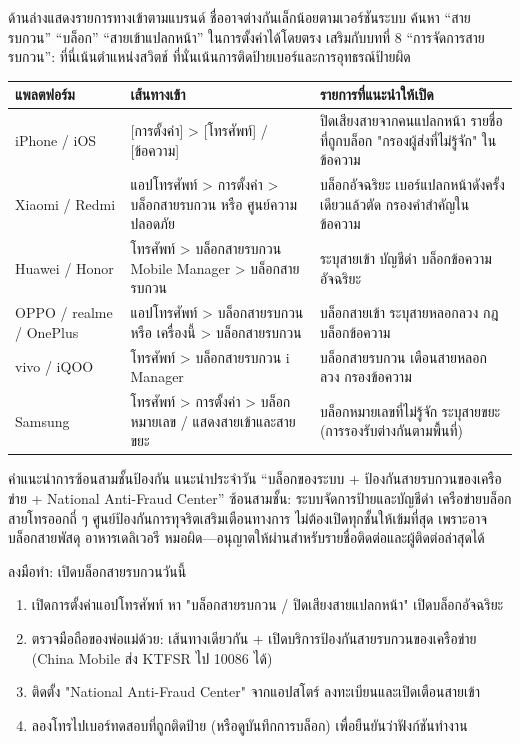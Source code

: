 
ด้านล่างแสดงรายการทางเข้าตามแบรนด์ ชื่ออาจต่างกันเล็กน้อยตามเวอร์ชันระบบ ค้นหา “สายรบกวน” “บล็อก” “สายเข้าแปลกหน้า” ในการตั้งค่าได้โดยตรง เสริมกับบทที่ 8 “การจัดการสายรบกวน”: ที่นี่เน้นตำแหน่งสวิตช์ ที่นั่นเน้นการติดป้ายเบอร์และการอุทธรณ์ป้ายผิด

\begin{center}
\begin{tabularx}{\linewidth}{|X|X|X|}
\hline
\textbf{แพลตฟอร์ม} & \textbf{เส้นทางเข้า} & \textbf{รายการที่แนะนำให้เปิด} \tabularnewline
\hline
iPhone / iOS & {}[การตั้งค่า] > [โทรศัพท์] / [ข้อความ] & ปิดเสียงสายจากคนแปลกหน้า รายชื่อที่ถูกบล็อก "กรองผู้ส่งที่ไม่รู้จัก" ในข้อความ \tabularnewline
Xiaomi / Redmi & แอปโทรศัพท์ > การตั้งค่า > บล็อกสายรบกวน หรือ ศูนย์ความปลอดภัย & บล็อกอัจฉริยะ เบอร์แปลกหน้าดังครั้งเดียวแล้วตัด กรองคำสำคัญในข้อความ \tabularnewline
Huawei / Honor & โทรศัพท์ > บล็อกสายรบกวน Mobile Manager > บล็อกสายรบกวน & ระบุสายเข้า บัญชีดำ บล็อกข้อความอัจฉริยะ \tabularnewline
OPPO / realme / OnePlus & แอปโทรศัพท์ > บล็อกสายรบกวน หรือ เครื่องนี้ > บล็อกสายรบกวน & บล็อกสายเข้า ระบุสายหลอกลวง กฎบล็อกข้อความ \tabularnewline
vivo / iQOO & โทรศัพท์ > บล็อกสายรบกวน i Manager & บล็อกสายรบกวน เตือนสายหลอกลวง กรองข้อความ \tabularnewline
Samsung & โทรศัพท์ > การตั้งค่า > บล็อกหมายเลข / แสดงสายเข้าและสายขยะ & บล็อกหมายเลขที่ไม่รู้จัก ระบุสายขยะ (การรองรับต่างกันตามพื้นที่) \tabularnewline
\hline
\end{tabularx}
\end{center}

\begin{tcbinfo}{คำแนะนำการซ้อนสามชั้นป้องกัน}
แนะนำประจำวัน “บล็อกของระบบ + ป้องกันสายรบกวนของเครือข่าย + National Anti-Fraud Center” ซ้อนสามชั้น: ระบบจัดการป้ายและบัญชีดำ เครือข่ายบล็อกสายโทรออกถี่ ๆ ศูนย์ป้องกันการทุจริตเสริมเตือนทางการ ไม่ต้องเปิดทุกชั้นให้เข้มที่สุด เพราะอาจบล็อกสายพัสดุ อาหารเดลิเวอรี หมอผิด—อนุญาตให้ผ่านสำหรับรายชื่อติดต่อและผู้ติดต่อล่าสุดได้

\end{tcbinfo}

\begin{tcbpractice}{ลงมือทำ: เปิดบล็อกสายรบกวนวันนี้}
\begin{enumerate}
  \item เปิดการตั้งค่าแอปโทรศัพท์ หา "บล็อกสายรบกวน / ปิดเสียงสายแปลกหน้า" เปิดบล็อกอัจฉริยะ
  \item ตรวจมือถือของพ่อแม่ด้วย: เส้นทางเดียวกัน + เปิดบริการป้องกันสายรบกวนของเครือข่าย (China Mobile ส่ง KTFSR ไป 10086 ได้)
  \item ติดตั้ง "National Anti-Fraud Center" จากแอปสโตร์ ลงทะเบียนและเปิดเตือนสายเข้า
  \item ลองโทรไปเบอร์ทดสอบที่ถูกติดป้าย (หรือดูบันทึกการบล็อก) เพื่อยืนยันว่าฟังก์ชันทำงาน
\end{enumerate}

\end{tcbpractice}

